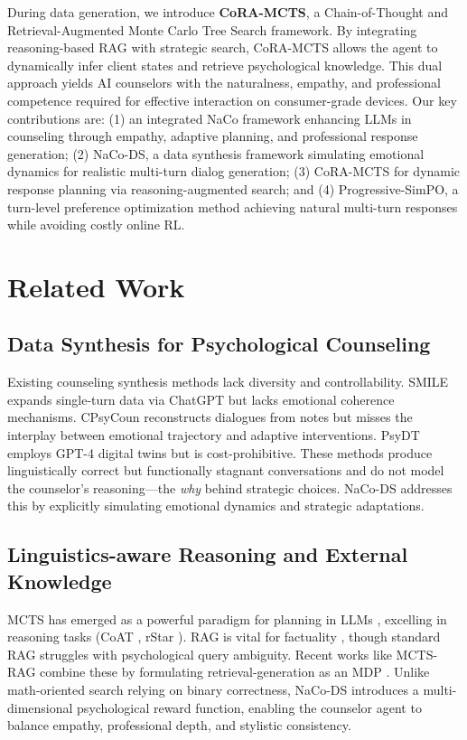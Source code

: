 \documentclass[lettersize,journal]{IEEEtran}
\begin{document}
During data generation, we introduce \textbf{CoRA-MCTS}, a Chain-of-Thought and Retrieval-Augmented Monte Carlo Tree Search framework. By integrating reasoning-based RAG \cite{Lewis2020, Gao2023} with strategic search, CoRA-MCTS allows the agent to dynamically infer client states and retrieve psychological knowledge. This dual approach yields AI counselors with the naturalness, empathy, and professional competence required for effective interaction on consumer-grade devices.
Our key contributions are: (1) an integrated NaCo framework enhancing LLMs in counseling through empathy, adaptive planning, and professional response generation; (2) NaCo-DS, a data synthesis framework simulating emotional dynamics for realistic multi-turn dialog generation; (3) CoRA-MCTS for dynamic response planning via reasoning-augmented search; and (4) Progressive-SimPO, a turn-level preference optimization method achieving natural multi-turn responses while avoiding costly online RL.

\section{Related Work}

\subsection{Data Synthesis for Psychological Counseling}
Existing counseling synthesis methods lack diversity and controllability. SMILE \cite{Qiu2024} expands single-turn data via ChatGPT but lacks emotional coherence mechanisms. CPsyCoun \cite{Zhang2024a} reconstructs dialogues from notes but misses the interplay between emotional trajectory and adaptive interventions. PsyDT \cite{Xie2024} employs GPT-4 digital twins but is cost-prohibitive. These methods produce linguistically correct but functionally stagnant conversations and do not model the counselor's reasoning---the \textit{why} behind strategic choices. NaCo-DS addresses this by explicitly simulating emotional dynamics and strategic adaptations.

\subsection{Linguistics-aware Reasoning and External Knowledge}
MCTS has emerged as a powerful paradigm for planning in LLMs \cite{Hao2023, Zhang2024b}, excelling in reasoning tasks (CoAT \cite{Pan2025}, rStar \cite{Qi2024}). RAG is vital for factuality \cite{Lewis2020, Gao2023, Asai2023}, though standard RAG struggles with psychological query ambiguity. Recent works like MCTS-RAG \cite{Hu2025} combine these by formulating retrieval-generation as an MDP \cite{Wang2024, Browne2012}. Unlike math-oriented search relying on binary correctness, NaCo-DS introduces a multi-dimensional psychological reward function, enabling the counselor agent to balance empathy, professional depth, and stylistic consistency.
\end{document}
